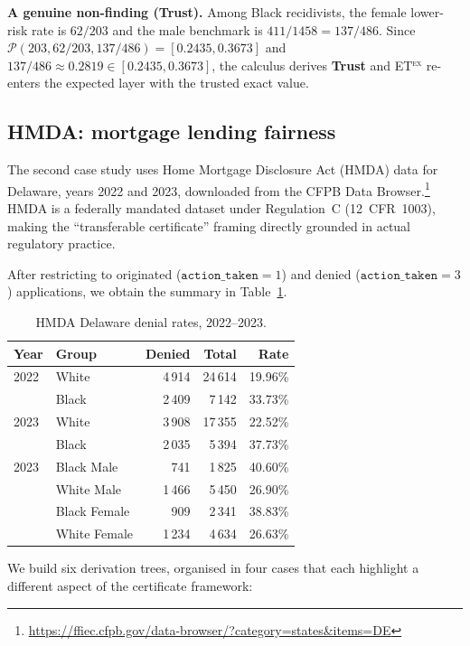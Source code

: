 \documentclass{ceurart}
\newcommand{\Trust}{\textbf{Trust}}
\newcommand{\CI}{\mathcal{P}}
\begin{document}
\smallskip\noindent
\textbf{A genuine non-finding (\Trust{}).}\;
Among Black recidivists, the female lower-risk rate is $62/203$
and the male benchmark is $411/1458 = 137/486$.
Since $\CI(203, 62/203, 137/486) = [0.2435, 0.3673]$
and $137/486 \approx 0.2819 \in [0.2435, 0.3673]$,
the calculus derives \Trust{} and \textsc{ET$^{\text{ex}}$}
re-enters the expected layer with the trusted exact value.

\subsection{HMDA: mortgage lending fairness}\label{sec:hmda}

The second case study uses Home Mortgage Disclosure Act (HMDA)
data for Delaware, years 2022 and 2023, downloaded from the
CFPB Data Browser.\footnote{%
\url{https://ffiec.cfpb.gov/data-browser/?category=states&items=DE}}
HMDA is a federally mandated dataset under Regulation~C
(12~CFR~1003), making the ``transferable certificate'' framing
directly grounded in actual regulatory practice.

After restricting to originated ($\texttt{action\_taken}=1$) and
denied ($\texttt{action\_taken}=3$) applications, we obtain
the summary in Table~\ref{tab:hmda-data}.

\begin{table}[t]
\small
\centering
\begin{tabular}{@{}llrrr@{}}
\toprule
Year & Group & Denied & Total & Rate \\
\midrule
2022 & White & 4\,914  & 24\,614 & 19.96\% \\
     & Black & 2\,409  & 7\,142  & 33.73\% \\
2023 & White & 3\,908  & 17\,355 & 22.52\% \\
     & Black & 2\,035  & 5\,394  & 37.73\% \\
\midrule
2023 & Black Male   &  741 & 1\,825 & 40.60\% \\
     & White Male   & 1\,466 & 5\,450 & 26.90\% \\
     & Black Female &  909 & 2\,341 & 38.83\% \\
     & White Female & 1\,234 & 4\,634 & 26.63\% \\
\bottomrule
\end{tabular}
\caption{HMDA Delaware denial rates, 2022--2023.}
\label{tab:hmda-data}
\end{table}

We build six derivation trees, organised in four cases that
each highlight a different aspect of the certificate framework:
\end{document}
